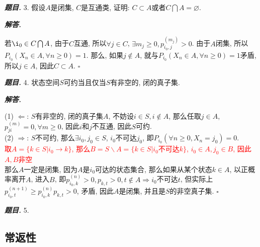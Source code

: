 \documentclass[10pt, a4paper, oneside]{ctexart}
\newenvironment{problem}{\begin{framed}\par\noindent\textbf{\textit{题目. }}}{\end{framed}\par}
\newenvironment{solution}{%
  \par\noindent\textbf{\textit{解答. }}\ignorespaces
}{%
  \hfill\ensuremath{\square}\par %
}
\begin{document}
\begin{problem}
    3. 假设$A$是闭集, $C$是互通类, 证明: $C\subset A$或者$C\bigcap A=\varnothing$.
\end{problem}
\begin{solution}
若$\i_0\in C\bigcap A$, 由于$C$互通, 所以$\forall j\in C$, $\exists m_j\geq 0, p_{i_0,j}^{(m_j)}>0$. 由于$A$闭集, 所以$P_{i_0}(X_n\in A,\forall n\geq 0)=1$. 那么, 如果$j\notin A$, 就与$P_{i_0}(X_n\in A,\forall n\geq 0)=1$矛盾, 所以$j\in A$, 因此$C\subset A$.
\end{solution}

\begin{problem}
    4. 状态空间$S$可约当且仅当$S$有非空的, 闭的真子集.
\end{problem}
\begin{solution}
(1) $\Leftarrow$: $S$有非空的, 闭的真子集$A$, 不妨设$i\in S,i\notin A$, 那么任取$j\in A$, $p_{ji}^{(m)}=0,\forall m\geq 0$, 因此$i$和$j$不互通, 因此$S$可约.\\
(2) $\Rightarrow$: $S$不可约, 那么$\exists i_0,j_0\in S$, $i_0$不可达$j_0$, 即$P_{i_0}(\forall n\geq 0, X_n=j_0)=0$.\\ \textcolor{red}{取$A=\{k\in S|i_0\to k\}$, 那么$B=S\backslash A=\{k\in S|i_0\text{不可达} k\}$, $i_0\in A, j_0\in B$, 因此$A,B$非空}\\
那么$A$一定是闭集, 因为$A$是$i_0$可达的状态集合, 那么如果从某个状态$k\in A$, 以正概率离开$A$, 进入$B$, 即$p_{i_0,k}^{(n)}>0, p_{k,t}>0,t\notin A\Rightarrow i_0$不可达$t$, 但实际上$p_{i_0,t}^{(n+1)}\geq p_{i_0,k}^{(n)}p_{k,t}>0 $, 矛盾, 因此$A$是闭集, 并且是$S$的非空真子集. 
\end{solution}

\begin{problem}
    5. 
\end{problem}

\subsection{常返性}
\end{document}
